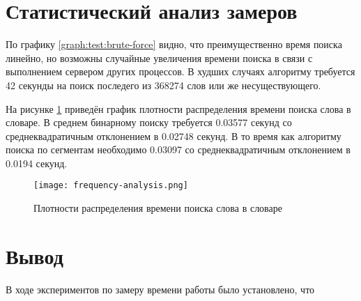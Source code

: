    \section{Статистический анализ замеров}
        По графику \ref{graph:test:brute-force} видно, 
        что преимущественно время поиска линейно, 
        но возможны случайные увеличения времени поиска 
        в связи с выполнением сервером других процессов.
        В худших случаях алгоритму требуется 42 секунды 
        на поиск последего из 368274 слов или же несуществующего. 

        На рисунке \ref{graph:analysis:frequency} приведён график
        плотности распределения времени поиска слова в словаре.
        В среднем бинарному поиску требуется 0.03577 секунд со 
        среднеквадратичным отклонением в 0.02748 секунд.
        В то время как алгоритму поиска по сегментам
        необходимо 0.03097 со среднеквадратичным отклонением в 0.0194 секунд. 

        \begin{figure}[h!]
            \centering
                \texttt{[image: frequency-analysis.png]}
                \caption{Плотности распределения времени поиска слова в словаре}
                \label{graph:analysis:frequency}
        \end{figure}

    \section{Вывод}
        В ходе экспериментов по замеру времени работы было установлено, что 
        
\newpage